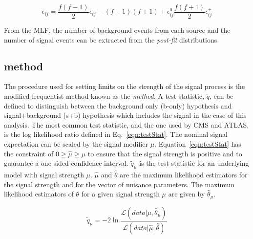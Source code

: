 \begin{equation}
\epsilon_{ij} = \frac{f\left(f-1\right)}{2}\epsilon_{ij}^{-} - \left(f-1\right)\left(f+1\right) + \epsilon_{ij}^{0}  \frac{f\left(f+1\right)}{2}\epsilon_{ij}^{+}
\label{eqn:VerticalMorphing}
\end{equation}

From the MLF, the number of background events from each source and the number of signal events can be extracted from the \emph{post-fit} distributions

\subsection{\CLS method}

The procedure used for setting limits on the strength of the signal process is the modified frequentist method known as the \emph{\CLS method}.
A test statistic, $\tilde{q}$, can be defined to distinguish between the background only (b-only) hypothesis and signal$+$background (s$+$b) hypothesis which includes the \tttt signal in the case of this analysis. The most common test statistic, and the one used by CMS and ATLAS, is the log likelihood ratio defined in Eq.~\ref{eqn:testStat}. The nominal signal expectation can be scaled by the signal modifier $\mu$. Equation~\ref{eqn:testStat} has the constraint of $0\geq \hat{\mu}\geq \mu$ to ensure that the signal strength is positive and to guarantee a one-sided confidence interval. $\tilde{q}_{\mu}$ is the test statistic for an underlying model with signal strength $\mu$. $\hat{\mu}$ and $\hat{\theta}$ are the maximum likelihood estimators for the signal strength and for the vector of nuisance parameters. The maximum likelihood estimators of $\theta$ for a given signal strength $\mu$ are given by $\hat{\theta}_{\mu}$.



\begin{equation}
\tilde{q}_{\mu} = -2\ln\frac{\mathcal{L}\left(data|\mu,\hat{\theta}_{\mu}\right)}{\mathcal{L}\left(data|\hat{\mu},\hat{\theta}\right)}
\label{eqn:testStat}
\end{equation}

